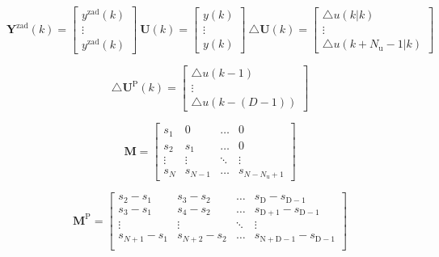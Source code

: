 \begin{equation}
\boldsymbol{Y}^{\mathrm{zad}}(k)=\left[
\begin{array}{c}
y^{\mathrm{zad}}(k)\\
\vdots\\
y^{\mathrm{zad}}(k)
\end{array}
\right] \
\boldsymbol{U}(k)=\left[
\begin{array}{c}
y(k)\\
\vdots\\
y(k)
\end{array}
\right] \
\triangle \boldsymbol{U}(k)=\left[
\begin{array}{c}
\triangle u(k|k)\\
\vdots\\
\triangle u(k+N_{\mathrm{u}}-1|k)
\end{array}
\right] \
\label{YYdUk}
\end{equation}

\begin{equation}
\triangle \boldsymbol{U}^{\mathrm{P}}(k)=\left[
\begin{array}{c}
\triangle u(k-1)\\
\vdots\\
\triangle u(k-(D-1))
\end{array}
\right]
\label{dUp}
\end{equation}

\begin{equation}
\boldsymbol{M}=\left[
\begin{array}
{cccc}
s_{1} & 0 & \ldots & 0\\
s_{2} & s_{1} & \ldots & 0\\
\vdots & \vdots & \ddots & \vdots\\
s_{N} & s_{N-1} & \ldots &  s_{N-N_{\mathrm{u}}+1}
\end{array}
\right]
\label{Marray}
\end{equation}

\begin{equation}
\boldsymbol{M}^{\mathrm{P}}=\left[
\begin{array}
{cccc}
s_{2} - s_{1} & s_{3} - s_{2} & \ldots & s_{\mathrm{D}} - s_{\mathrm{D-1}}\\
s_{3} - s_{1} & s_{4} - s_{2} & \ldots & s_{\mathrm{D+1}} - s_{\mathrm{D-1}}\\
\vdots & \vdots & \ddots & \vdots\\
s_{N+1} - s_{1} & s_{N+2} - s_{2} & \ldots & s_{\mathrm{N+D-1}} - s_{\mathrm{D-1}}\\
\end{array}
\right]
\label{MParray}
\end{equation}

